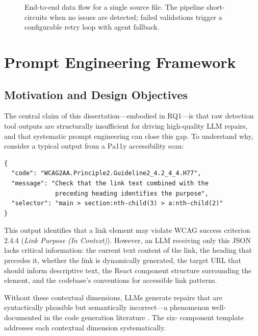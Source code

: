 \begin{figure}[htbp]
\begin{tikzpicture}
\end{tikzpicture}
\caption{End-to-end data flow for a single source file.  The pipeline
  short-circuits when no issues are detected; failed validations trigger
  a configurable retry loop with agent fallback.}
\label{fig:dataflow}
\end{figure}

\section{Prompt Engineering Framework}
\label{sec:prompt_template}

\subsection{Motivation and Design Objectives}

The central claim of this dissertation—embodied in RQ1—is that raw detection
tool outputs are structurally insufficient for driving high-quality LLM
repairs, and that systematic prompt engineering can close this gap.  To
understand why, consider a typical output from a Pa11y accessibility scan:

\begin{verbatim}
{
  "code": "WCAG2AA.Principle2.Guideline2_4.2_4_4.H77",
  "message": "Check that the link text combined with the
              preceding heading identifies the purpose",
  "selector": "main > section:nth-child(3) > a:nth-child(2)"
}
\end{verbatim}

\noindent
This output identifies that a link element may violate WCAG success criterion
2.4.4 (\emph{Link Purpose (In Context)}).  However, an LLM receiving only
this JSON lacks critical information: the current text content of the link,
the heading that precedes it, whether the link is dynamically generated, the
target URL that should inform descriptive text, the React component structure
surrounding the element, and the codebase's conventions for accessible link
patterns.

Without these contextual dimensions, LLMs generate repairs that are
syntactically plausible but semantically incorrect—a phenomenon well-documented
in the code generation literature \cite{chen2023llm,xia2023}.  The six-
component template addresses each contextual dimension systematically.

